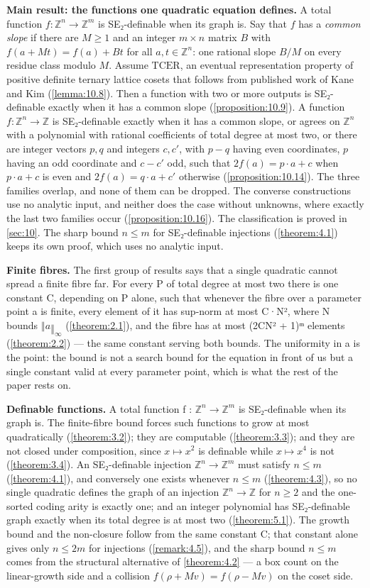 \textbf{Main result: the functions one quadratic equation defines.} A total function $f : ℤ^{n} → ℤ^{m}$ is SE₂-definable when its graph is. Say that $f$ has a \emph{common slope} if there are $M ≥ 1$ and an integer $m × n$ matrix $B$ with $f(a + Mt) = f(a) + Bt$ for all $a, t ∈ ℤ^{n}$: one rational slope $B/M$ on every residue class modulo $M$. Assume $\mathrm{TCER}$, an eventual representation property of positive definite ternary lattice cosets that follows from published work of Kane and Kim (\cref{lemma:10.8}). Then a function with two or more outputs is SE₂-definable exactly when it has a common slope (\cref{proposition:10.9}). A function $f : ℤ^{n} → ℤ$ is SE₂-definable exactly when it has a common slope, or agrees on $ℤ^{n}$ with a polynomial with rational coefficients of total degree at most two, or there are integer vectors $p, q$ and integers $c, c'$, with $p - q$ having even coordinates, $p$ having an odd coordinate and $c - c'$ odd, such that $2f(a) = p · a + c$ when $p · a + c$ is even and $2f(a) = q · a + c'$ otherwise (\cref{proposition:10.14}). The three families overlap, and none of them can be dropped. The converse constructions use no analytic input, and neither does the case without unknowns, where exactly the last two families occur (\cref{proposition:10.16}). The classification is proved in \cref{sec:10}. The sharp bound $n ≤ m$ for SE₂-definable injections (\cref{theorem:4.1}) keeps its own proof, which uses no analytic input.

\textbf{Finite fibres.} The first group of results says that a single quadratic cannot spread a finite fibre far. For every P of total degree at most two there is one constant C, depending on P alone, such that whenever the fibre over a parameter point a is finite, every element of it has sup-norm at most C·N², where N bounds $‖a‖_{∞}$ (\cref{theorem:2.1}), and the fibre has at most (2CN² + 1)ᵐ elements (\cref{theorem:2.2}) — the same constant serving both bounds. The uniformity in a is the point: the bound is not a search bound for the equation in front of us but a single constant valid at every parameter point, which is what the rest of the paper rests on.

\textbf{Definable functions.} A total function f : $ℤ^{n} → ℤ^{m}$ is SE₂-definable when its graph is. The finite-fibre bound forces such functions to grow at most quadratically (\cref{theorem:3.2}); they are computable (\cref{theorem:3.3}); and they are not closed under composition, since $x ↦ x^{2}$ is definable while $x ↦ x^{4}$ is not (\cref{theorem:3.4}). An SE₂-definable injection $ℤ^{n} → ℤ^{m}$ must satisfy $n ≤ m$ (\cref{theorem:4.1}), and conversely one exists whenever $n ≤ m$ (\cref{theorem:4.3}), so no single quadratic defines the graph of an injection $ℤ^{n} → ℤ$ for $n ≥ 2$ and the one-sorted coding arity is exactly one; and an integer polynomial has SE₂-definable graph exactly when its total degree is at most two (\cref{theorem:5.1}). The growth bound and the non-closure follow from the same constant C; that constant alone gives only $n ≤ 2m$ for injections (\cref{remark:4.5}), and the sharp bound $n ≤ m$ comes from the structural alternative of \cref{theorem:4.2} — a box count on the linear-growth side and a collision $f(ρ + Mv) = f(ρ − Mv)$ on the coset side.


